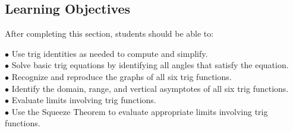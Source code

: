 \documentclass{ximera}
\begin{document}


\subsection{Learning Objectives}
After completing this section, students should be able to:
\vspace{.05in}

\noindent$\bullet$ Use trig identities as needed to compute and simplify.
\\$\bullet$ Solve basic trig equations by identifying all angles that satisfy the equation.
\\$\bullet$ Recognize and reproduce the graphs of all six trig functions.
\\$\bullet$ Identify the domain, range, and vertical asymptotes of all six trig functions.
\\$\bullet$ Evaluate limits involving trig functions.
\\$\bullet$ Use the Squeeze Theorem to evaluate appropriate limits involving trig functions.
\end{document}
